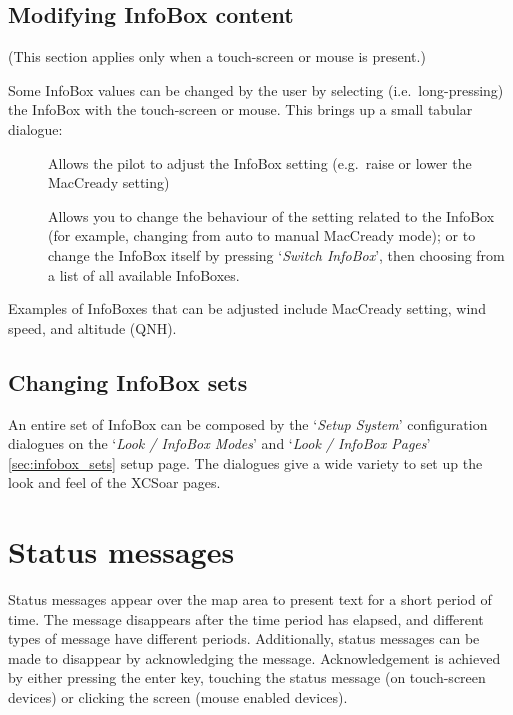 \blink{}\blink{}\blink{}\blink{}


\subsection*{Modifying InfoBox content}

(This section applies only when a touch-screen or mouse is present.)

Some InfoBox values can be changed by the user by selecting (i.e.\ long-pressing) the
InfoBox with the touch-screen or mouse.  This brings up a small tabular dialogue:

\begin{description}
\item[]  
  Allows the pilot to adjust the InfoBox setting (e.g.\ raise or lower the
  MacCready setting)

\item[]
  Allows you to change the behaviour of the setting related to the InfoBox 
  (for example, changing from auto to manual MacCready mode); or 
  to change the InfoBox itself by pressing `\emph{Switch InfoBox}', then 
  choosing from a list of all available InfoBoxes.

\end{description}

Examples of InfoBoxes that can
be adjusted include MacCready setting, wind speed, and altitude (QNH).


\subsection*{Changing InfoBox sets}

An entire set of InfoBox can be composed by the `\emph{Setup System}' configuration 
dialogues on the `\emph{Look / InfoBox Modes}' and `\emph{Look / InfoBox Pages}' 
\ref{sec:infobox_sets} setup page. 
The dialogues give a wide variety to set up the look and feel of the XCSoar pages.  


\section{Status messages}

Status messages appear over the map area to present text for a short period of
time.  The message disappears after the time period has elapsed, and different
types of message have different periods. Additionally, status messages can be
made to disappear by acknowledging the message.  Acknowledgement is achieved by
either pressing the enter key, touching the status
message (on touch-screen devices) or clicking the screen (mouse enabled devices).

